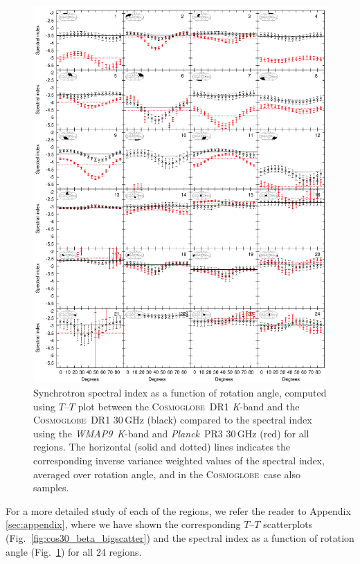 \documentclass[twocolumn]{../../common/aa}
\def\WMAPnine{\emph{WMAP9}}
\def\Planck{\emph{Planck}}
\newcommand{\Cosmoglobe}{\textsc{Cosmoglobe}}
\newcommand{\K}[0]{\textit K}
\begin{document}
\begin{figure}
        \centering
        \includegraphics[width=0.9\linewidth]{figures/cos30_ut_big_multialphaplot_converted.pdf}
        \caption{Synchrotron spectral index as a function of rotation angle, computed using $T$--$T$ plot between the \Cosmoglobe\ DR1 \K-band and the \Cosmoglobe\ DR1 30\,GHz (black) compared to the spectral index using the \WMAPnine\ \K-band and \Planck\ PR3 30\,GHz (red) for all regions. The horizontal (solid and dotted) lines indicates the corresponding inverse variance weighted values of the spectral index, averaged over rotation angle, and in the \Cosmoglobe\ case also samples.}
        \label{fig:cos30_beta_bigalpha}
\end{figure}




For a more detailed study of each of the regions, we refer the reader to Appendix \ref{sec:appendix}, where we have shown the corresponding $T$--$T$ scatterplots (Fig.~\ref{fig:cos30_beta_bigscatter}) and the spectral index as a function of rotation angle (Fig.~\ref{fig:cos30_beta_bigalpha}) for all 24 regions.
\end{document}
